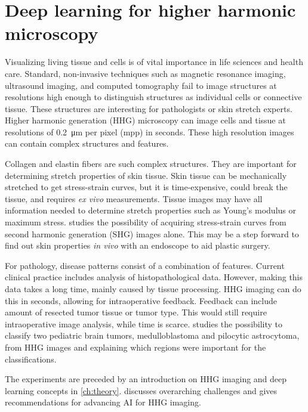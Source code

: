 \section{Deep learning for higher harmonic microscopy}
Visualizing living tissue and cells is of vital importance in life sciences and health care.
Standard, non-invasive techniques such as magnetic resonance imaging, ultrasound imaging, and computed tomography fail to image structures at resolutions high enough to distinguish structures as individual cells or connective tissue.
These structures are interesting for pathologists or skin stretch experts.
Higher harmonic generation (HHG) microscopy can image cells and tissue at resolutions of \qty{0.2}{\micro\meter} per pixel (mpp) in seconds.
These high resolution images %
can contain complex structures and features.

Collagen and elastin fibers are such complex structures.
They are important for determining stretch properties of skin tissue.
Skin tissue can be mechanically stretched to get stress-strain curves, but it is time-expensive, could break the tissue, and requires \emph{ex vivo} measurements.
Tissue images may have all information needed to determine stretch properties such as Young's modulus or maximum stress.
 studies the possibility of acquiring stress-strain curves from second harmonic generation (SHG) images alone.
This may be a step forward to find out skin properties \emph{in vivo} with an endoscope to aid plastic surgery.

For pathology, disease patterns consist of a combination of features.
Current clinical practice includes analysis of histopathological data.
However, making this data takes a long time, mainly caused by tissue processing.
HHG imaging can do this in seconds, allowing for intraoperative feedback.
Feedback can \eg include amount of resected tumor tissue or tumor type.
This would still require intraoperative image analysis, while time is scarce.
 studies the possibility to classify two pediatric brain tumors, medulloblastoma and pilocytic astrocytoma, from HHG images and explaining which regions were important for the classifications.

The experiments are preceded by an introduction on HHG imaging and deep learning concepts in \cref{ch:theory}.
 discusses overarching challenges and gives recommendations for advancing AI for HHG imaging.

